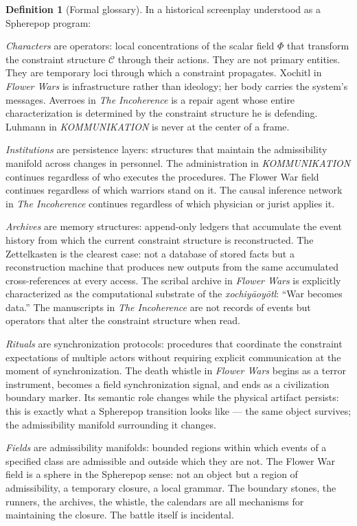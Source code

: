 \documentclass[11pt, a4paper]{article}
\theoremstyle{definition}
\newtheorem{definition}{Definition}
\theoremstyle{remark}
\begin{document}
\begin{definition}[Formal glossary]
In a historical screenplay understood as a Spherepop program:

\textit{Characters} are operators: local concentrations of the scalar field
$\Phi$ that transform the constraint structure $\mathcal{C}$ through their
actions. They are not primary entities. They are temporary loci through which
a constraint propagates. Xochitl in \textit{Flower Wars} is infrastructure
rather than ideology; her body carries the system's messages. Averroes in
\textit{The Incoherence} is a repair agent whose entire characterization is
determined by the constraint structure he is defending. Luhmann in
\textit{KOMMUNIKATION} is never at the center of a frame.

\textit{Institutions} are persistence layers: structures that maintain the
admissibility manifold across changes in personnel. The administration in
\textit{KOMMUNIKATION} continues regardless of who executes the procedures.
The Flower War field continues regardless of which warriors stand on it.
The causal inference network in \textit{The Incoherence} continues regardless
of which physician or jurist applies it.

\textit{Archives} are memory structures: append-only ledgers that accumulate
the event history from which the current constraint structure is reconstructed.
The Zettelkasten is the clearest case: not a database of stored facts but
a reconstruction machine that produces new outputs from the same accumulated
cross-references at every access. The scribal archive in \textit{Flower Wars}
is explicitly characterized as the computational substrate of the
\textit{xochiy\={a}oy\={o}tl}: ``War becomes data.'' The manuscripts in
\textit{The Incoherence} are not records of events but operators that alter
the constraint structure when read.

\textit{Rituals} are synchronization protocols: procedures that coordinate
the constraint expectations of multiple actors without requiring explicit
communication at the moment of synchronization. The death whistle in
\textit{Flower Wars} begins as a terror instrument, becomes a field
synchronization signal, and ends as a civilization boundary marker. Its
semantic role changes while the physical artifact persists: this is exactly
what a Spherepop transition looks like --- the same object survives; the
admissibility manifold surrounding it changes.

\textit{Fields} are admissibility manifolds: bounded regions within which
events of a specified class are admissible and outside which they are not.
The Flower War field is a sphere in the Spherepop sense: not an object
but a region of admissibility, a temporary closure, a local grammar.
The boundary stones, the runners, the archives, the whistle, the calendars
are all mechanisms for maintaining the closure. The battle itself is incidental.


\end{definition}
\end{document}
